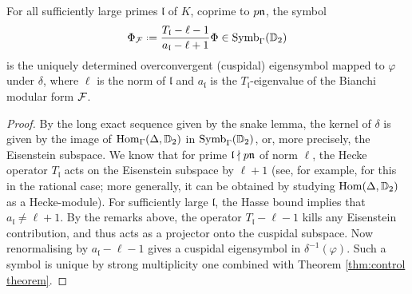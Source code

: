 \documentclass[a4paper,10pt]{article}
\numberwithin{equation}{section}
\begin{document}
\begin{proposition}
	For all sufficiently large primes $\mathfrak{l}$ of $K$, coprime to $p\mathfrak{n}$, the symbol
	\[
		\Phi_{\f} \defeq \frac{T_{\mathfrak{l}} - \ell - 1}{a_{\mathfrak{l}} - \ell + 1} \Phi \in \Symb_\Gamma(\D_2)
	\] 
	is the uniquely determined overconvergent (cuspidal) eigensymbol mapped to $\varphi$ under $\delta$, where $\ell$ is the norm of $\mathfrak{l}$ and $a_{\mathfrak{l}}$ is the $T_{\mathfrak{l}}$-eigenvalue of the Bianchi modular form $\mathcal{F}$.
\end{proposition}
\begin{proof}
By the long exact sequence given by the snake lemma, the kernel of $\delta$ is given by the image of $\mathrm{Hom}_\Gamma(\Delta,\mathbb{D}_2)$ in $\mathrm{Symb}_\Gamma(\mathbb{D}_2)$, or, more precisely, the Eisenstein subspace. We know that for prime $\mathfrak{l}\nmid p\mathfrak{n}$ of norm $\ell$, the Hecke operator $T_{\mathfrak{l}}$ acts on the Eisenstein subspace by $\ell + 1$ (see, for example, \cite[Rem.~5.2]{PS11} for this in the rational case; more generally, it can be obtained by studying $\mathrm{Hom}(\Delta,\mathbb{D}_2)$ as a Hecke-module). For sufficiently large $\mathfrak{l}$, the Hasse bound implies that $a_{\mathfrak{l}} \neq \ell + 1$. By the remarks above, the operator $T_{\mathfrak{l}} - \ell -1$ kills any Eisenstein contribution, and thus acts as a projector onto the cuspidal subspace. Now renormalising by $a_{\mathfrak{l}} - \ell - 1$ gives a cuspidal eigensymbol in $\delta^{-1}(\varphi)$. Such a symbol is unique by strong multiplicity one combined with Theorem \ref{thm:control theorem}.
\end{proof}
\end{document}
